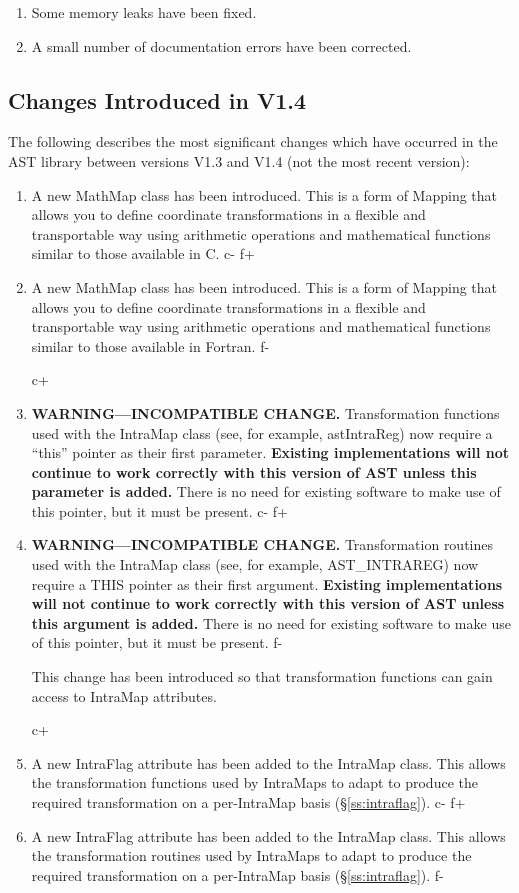 \documentclass[twoside,11pt]{article}
\newcommand{\secref}[1]{\S\ref{#1}}
\newcommand{\secref}[1]{\ref{#1}}
\begin{document}
\begin{enumerate}
\item Some memory leaks have been fixed.

\item A small number of documentation errors have been corrected.
\end{enumerate}

\subsection{Changes Introduced in V1.4}

The following describes the most significant changes which have occurred
in the AST library between versions V1.3 and V1.4 (not the most recent
version):

\begin{enumerate}
c+
\item A new MathMap class has been introduced. This is a form of
Mapping that allows you to define coordinate transformations in a
flexible and transportable way using arithmetic operations and
mathematical functions similar to those available in C.
c-
f+
\item A new MathMap class has been introduced. This is a form of
Mapping that allows you to define coordinate transformations in a
flexible and transportable way using arithmetic operations and
mathematical functions similar to those available in Fortran.
f-

c+
\item {\bf{WARNING---INCOMPATIBLE CHANGE.}} Transformation functions
used with the IntraMap class (see, for example, astIntraReg) now
require a ``this'' pointer as their first parameter. {\bf{Existing
implementations will not continue to work correctly with this version
of AST unless this parameter is added.}} There is no need for existing
software to make use of this pointer, but it must be present.
c-
f+
\item {\bf{WARNING---INCOMPATIBLE CHANGE.}} Transformation routines
used with the IntraMap class (see, for example, AST\_INTRAREG) now
require a THIS pointer as their first argument. {\bf{Existing
implementations will not continue to work correctly with this version
of AST unless this argument is added.}} There is no need for existing
software to make use of this pointer, but it must be present.
f-

This change has been introduced so that transformation functions can gain
access to IntraMap attributes.

c+
\item A new IntraFlag attribute has been added to the IntraMap
class. This allows the transformation functions used by IntraMaps to
adapt to produce the required transformation on a per-IntraMap basis
(\secref{ss:intraflag}).
c-
f+
\item A new IntraFlag attribute has been added to the IntraMap
class. This allows the transformation routines used by IntraMaps to
adapt to produce the required transformation on a per-IntraMap basis
(\secref{ss:intraflag}).
f-


\end{enumerate}
\end{document}
